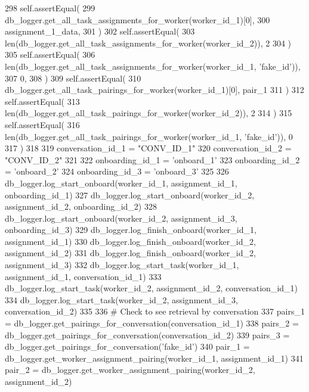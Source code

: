 \begin{DoxyCode}
298         self.assertEqual(
299             db\_logger.get\_all\_task\_assignments\_for\_worker(worker\_id\_1)[0],
300             assignment\_1\_data,
301         )
302         self.assertEqual(
303             len(db\_logger.get\_all\_task\_assignments\_for\_worker(worker\_id\_2)), 2
304         )
305         self.assertEqual(
306             len(db\_logger.get\_all\_task\_assignments\_for\_worker(worker\_id\_1, \textcolor{stringliteral}{'fake\_id'})),
307             0,
308         )
309         self.assertEqual(
310             db\_logger.get\_all\_task\_pairings\_for\_worker(worker\_id\_1)[0], pair\_1
311         )
312         self.assertEqual(
313             len(db\_logger.get\_all\_task\_pairings\_for\_worker(worker\_id\_2)), 2
314         )
315         self.assertEqual(
316             len(db\_logger.get\_all\_task\_pairings\_for\_worker(worker\_id\_1, \textcolor{stringliteral}{'fake\_id'})), 0
317         )
318 
319         conversation\_id\_1 = \textcolor{stringliteral}{"CONV\_ID\_1"}
320         conversation\_id\_2 = \textcolor{stringliteral}{"CONV\_ID\_2"}
321 
322         onboarding\_id\_1 = \textcolor{stringliteral}{'onboard\_1'}
323         onboarding\_id\_2 = \textcolor{stringliteral}{'onboard\_2'}
324         onboarding\_id\_3 = \textcolor{stringliteral}{'onboard\_3'}
325 
326         db\_logger.log\_start\_onboard(worker\_id\_1, assignment\_id\_1, onboarding\_id\_1)
327         db\_logger.log\_start\_onboard(worker\_id\_2, assignment\_id\_2, onboarding\_id\_2)
328         db\_logger.log\_start\_onboard(worker\_id\_2, assignment\_id\_3, onboarding\_id\_3)
329         db\_logger.log\_finish\_onboard(worker\_id\_1, assignment\_id\_1)
330         db\_logger.log\_finish\_onboard(worker\_id\_2, assignment\_id\_2)
331         db\_logger.log\_finish\_onboard(worker\_id\_2, assignment\_id\_3)
332         db\_logger.log\_start\_task(worker\_id\_1, assignment\_id\_1, conversation\_id\_1)
333         db\_logger.log\_start\_task(worker\_id\_2, assignment\_id\_2, conversation\_id\_1)
334         db\_logger.log\_start\_task(worker\_id\_2, assignment\_id\_3, conversation\_id\_2)
335 
336         \textcolor{comment}{# Check to see retrieval by conversation}
337         pairs\_1 = db\_logger.get\_pairings\_for\_conversation(conversation\_id\_1)
338         pairs\_2 = db\_logger.get\_pairings\_for\_conversation(conversation\_id\_2)
339         pairs\_3 = db\_logger.get\_pairings\_for\_conversation(\textcolor{stringliteral}{'fake\_id'})
340         pair\_1 = db\_logger.get\_worker\_assignment\_pairing(worker\_id\_1, assignment\_id\_1)
341         pair\_2 = db\_logger.get\_worker\_assignment\_pairing(worker\_id\_2, assignment\_id\_2)

\end{DoxyCode}
